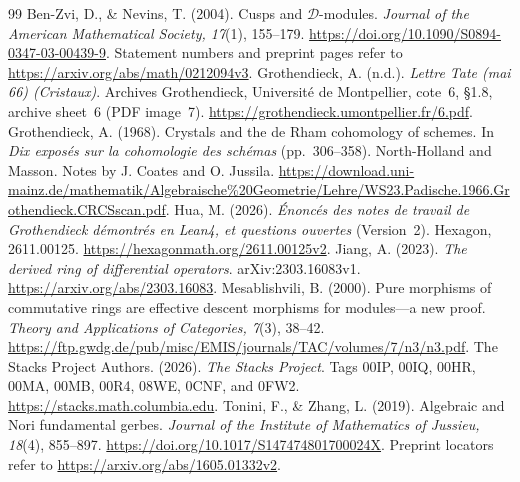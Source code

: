 \documentclass[11pt]{article}
\theoremstyle{definition}\newtheorem{definition}[theorem]{Definition}
\theoremstyle{remark}\newtheorem{remark}[theorem]{Remark}
\begin{document}
\begin{thebibliography}{99}
Ben-Zvi, D., \& Nevins, T. (2004). Cusps and $\mathcal D$-modules. \emph{Journal of the American Mathematical Society, 17}(1), 155--179. \url{https://doi.org/10.1090/S0894-0347-03-00439-9}. Statement numbers and preprint pages refer to \url{https://arxiv.org/abs/math/0212094v3}.
Grothendieck, A. (n.d.). \emph{Lettre Tate (mai 66) (Cristaux)}. Archives Grothendieck, Universit\'e de Montpellier, cote~6, \S1.8, archive sheet~6 (PDF image~7). \url{https://grothendieck.umontpellier.fr/6.pdf}.
Grothendieck, A. (1968). Crystals and the de Rham cohomology of schemes. In \emph{Dix expos\'es sur la cohomologie des sch\'emas} (pp.~306--358). North-Holland and Masson. Notes by J. Coates and O. Jussila. \url{https://download.uni-mainz.de/mathematik/Algebraische%20Geometrie/Lehre/WS23.Padische.1966.Grothendieck.CRCSscan.pdf}.
Hua, M. (2026). \emph{\'Enonc\'es des notes de travail de Grothendieck d\'emontr\'es en Lean4, et questions ouvertes} (Version~2). Hexagon, 2611.00125. \url{https://hexagonmath.org/2611.00125v2}.
Jiang, A. (2023). \emph{The derived ring of differential operators}. arXiv:2303.16083v1. \url{https://arxiv.org/abs/2303.16083}.
Mesablishvili, B. (2000). Pure morphisms of commutative rings are effective descent morphisms for modules---a new proof. \emph{Theory and Applications of Categories, 7}(3), 38--42. \url{https://ftp.gwdg.de/pub/misc/EMIS/journals/TAC/volumes/7/n3/n3.pdf}.
The Stacks Project Authors. (2026). \emph{The Stacks Project}. Tags 00IP, 00IQ, 00HR, 00MA, 00MB, 00R4, 08WE, 0CNF, and 0FW2. \url{https://stacks.math.columbia.edu}.
Tonini, F., \& Zhang, L. (2019). Algebraic and Nori fundamental gerbes. \emph{Journal of the Institute of Mathematics of Jussieu, 18}(4), 855--897. \url{https://doi.org/10.1017/S147474801700024X}. Preprint locators refer to \url{https://arxiv.org/abs/1605.01332v2}.
\end{thebibliography}
\end{document}
